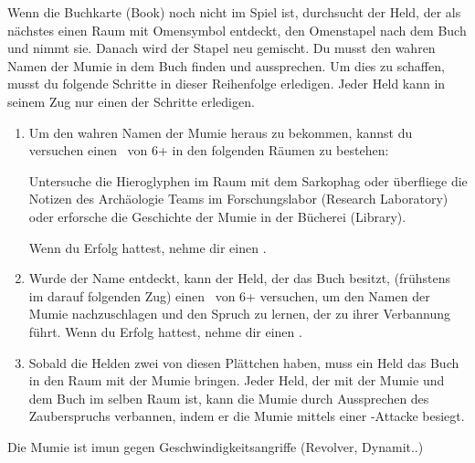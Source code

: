   \begin{itemize}
        \bitem Wenn die Buchkarte (Book) noch nicht im Spiel ist, durchsucht der Held, der als nächstes einen Raum mit Omensymbol entdeckt, den Omenstapel nach dem Buch und nimmt sie. Danach wird der Stapel neu gemischt.
        \bitem Du musst den wahren Namen der Mumie in dem Buch finden und aussprechen. Um dies zu schaffen, musst du folgende Schritte in dieser Reihenfolge erledigen. Jeder Held kann in seinem Zug nur einen der Schritte erledigen.

        \begin{enumerate}
            \item Um den wahren Namen der Mumie heraus zu bekommen, kannst du versuchen einen \knowroll\ von 6+ in den folgenden Räumen zu bestehen:

            \begin{itemize}
                \bitem Untersuche die Hieroglyphen im Raum mit dem Sarkophag oder
                \bitem überfliege die Notizen des Archäologie Teams im Forschungslabor (Research Laboratory) oder
                \bitem erforsche die Geschichte der Mumie in der Bücherei (Library).
            \end{itemize}
            Wenn du Erfolg hattest, nehme dir einen .

            \item Wurde der Name entdeckt, kann der Held, der das Buch besitzt, (frühstens im darauf folgenden Zug) einen \knowroll\ von 6+ versuchen, um den Namen der Mumie nachzuschlagen und den Spruch zu lernen, der zu ihrer Verbannung führt. Wenn du Erfolg hattest, nehme dir einen .


            \item Sobald die Helden zwei von diesen Plättchen haben, muss ein Held das Buch in den Raum mit der Mumie bringen. Jeder Held, der mit der Mumie und dem Buch im selben Raum ist, kann die Mumie durch Aussprechen des Zauberspruchs verbannen, indem er  die Mumie mittels einer \sanity-Attacke besiegt.
        \end{enumerate}

    \bitem Die Mumie ist imun gegen Geschwindigkeitsangriffe (Revolver, Dynamit..)

    \end{itemize}


